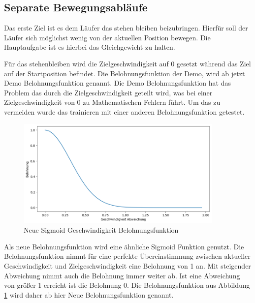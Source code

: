 \subsection{Separate Bewegungsabläufe}

Das erste Ziel ist es dem Läufer das stehen bleiben beizubringen. Hierfür soll der Läufer sich möglichst wenig von der aktuellen Position bewegen. Die Hauptaufgabe ist es hierbei das Gleichgewicht zu halten. 

Für das stehenbleiben wird die Zielgeschwindigkeit auf 0 gesetzt während das Ziel auf der Startposition befindet. Die Belohnungsfunktion der Demo, wird ab jetzt Demo Belohnungsfunktion genannt. Die Demo Belohnungsfunktion hat das Problem das durch die Zielgeschwindigkeit geteilt wird, was bei einer Zielgeschwindigkeit von 0 zu Mathematischen Fehlern führt. Um das zu vermeiden wurde das trainieren mit einer anderen Belohnungsfunktion getestet.

\begin{figure}[H]
  \centering  
  \includegraphics[width=0.9\textwidth]{img/plot_vel_reward_neu}
  \caption{Neue Sigmoid Geschwindigkeit Belohnungsfunktion}
  \label{fig:plot_vel_reward_neu}
\end{figure}

Als neue Belohnungsfunktion wird eine ähnliche Sigmoid Funktion genutzt. Die Belohnungsfunktion nimmt für eine perfekte Übereinstimmung zwischen aktueller Geschwindigkeit und Zielgeschwindigkeit eine Belohnung von 1 an. Mit steigender Abweichung nimmt auch die Belohnung immer weiter ab. Ist eine Abweichung von größer 1 erreicht ist die Belohnung 0. Die Belohnungsfunktion aus Abbildung \ref{fig:plot_vel_reward_neu} wird daher ab hier Neue Belohnungsfunktion genannt.

